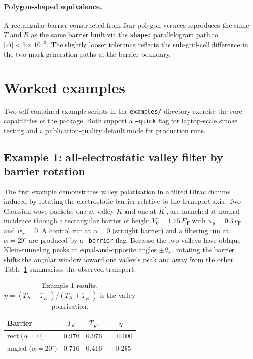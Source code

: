 \documentclass[preprint, 11pt]{elsarticle}
\newcommand{\vF}{v_\mathrm{F}}
\newcommand{\EF}{E_\mathrm{F}}
\begin{document}
\paragraph{Polygon-shaped equivalence.}
A rectangular barrier constructed from four polygon vertices
reproduces the same $T$ and $R$ as the same barrier built via the
\texttt{shaped} parallelogram path to $|\Delta|<5\times10^{-3}$. The
slightly looser tolerance reflects the sub-grid-cell difference in
the two mask-generation paths at the barrier boundary.

\section{Worked examples}
\label{sec:examples}

Two self-contained example scripts in the \texttt{examples/}
directory exercise the core capabilities of the package. Both support
a \texttt{--quick} flag for laptop-scale smoke testing and a
publication-quality default mode for production runs.

\subsection{Example 1: all-electrostatic valley filter by barrier rotation}
\label{sec:ex1}

The first example demonstrates valley polarisation in a tilted Dirac
channel induced by rotating the electrostatic barrier relative to the
transport axis. Two Gaussian wave packets, one at valley $K$ and one
at $K^\prime$, are launched at normal incidence through a rectangular
barrier of height $V_0=1.75\,\EF$ with $w_y=0.3\,\vF$ and
$w_x=0$. A control run at $\alpha=0$ (straight barrier) and a
filtering run at $\alpha=20^\circ$ are produced by a \texttt{--barrier}
flag. Because the two valleys have oblique Klein-tunneling peaks at
equal-and-opposite angles $\pm\theta_K$, rotating the barrier shifts
the angular window toward one valley's peak and away from the other.
Table~\ref{tab:ex1} summarises the observed transport.

\begin{table}[ht]
\centering
\caption{Example 1 results. $\eta=(T_K-T_{K^\prime})/(T_K+T_{K^\prime})$
         is the valley polarisation.}
\label{tab:ex1}
\begin{tabular}{lccc}
\hline
Barrier & $T_K$ & $T_{K^\prime}$ & $\eta$ \\
\hline
rect ($\alpha=0$)      & 0.976 & 0.976 & $\phantom{+}0.000$ \\
angled ($\alpha=20^\circ$) & 0.716 & 0.416 & $+0.265$ \\
\hline
\end{tabular}
\end{table}
\end{document}
